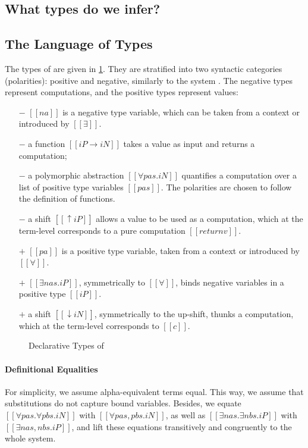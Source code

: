 \subsection{What types do we infer?}


\subsection{The Language of Types}

The types of \fexists are given in \cref{fig:declarative-types}.
They are stratified into two syntactic 
categories (polarities): positive and negative,  
similarly to the \CBPV system \cite{levy2006:cbpv}.
The negative types represent computations, and the positive types represent values:
\begin{itemize}
\item [$-$] $[[na]]$ is a negative type variable, which can be taken from a context or introduced by $[[∃]]$.
\item [$-$] a function $[[iP → iN]]$ takes a value as input and returns a computation; 
\item [$-$] a polymorphic abstraction $[[∀pas.iN]]$ quantifies a computation over
  a list of positive type variables 
  $[[pas]]$. The polarities are chosen to follow the definition of functions.
\item [$-$] a shift $[[↑iP]]$ allows a value to be used as a computation, 
  which at the term-level corresponds to a pure computation $[[return v]]$.
\item [$+$] $[[pa]]$ is a positive type variable, taken from a context or introduced by $[[∀]]$.
\item [$+$] $[[∃nas.iP]]$, symmetrically to $[[∀]]$, 
  binds negative variables in a positive type $[[iP]]$. 
\item [$+$] a shift $[[↓iN]]$, symmetrically to the up-shift, 
  thunks a computation, which at the term-level corresponds to $[[ {c} ]]$.
\end{itemize}

\begin{figure}[h]
  \begin{multicols}{2}
    \ottgrammartabular{
      \ottiN\ottinterrule
    }
    \ottgrammartabular{
      \ottiP\ottinterrule
    }
    \columnbreak
  \end{multicols}
  \caption{Declarative Types of \fexists}
  \label{fig:declarative-types}
\end{figure}

\paragraph{Definitional Equalities}
For simplicity, we assume alpha-equivalent terms equal.
This way, we assume that substitutions do not capture bound variables.
Besides, we equate
$[[∀pas.∀pbs.iN]]$ with $[[∀pas,pbs.iN]]$, 
as well as $[[∃nas.∃nbs.iP]]$ with $[[∃nas,nbs.iP]]$,
and lift these equations transitively and congruently 
to the whole system.

